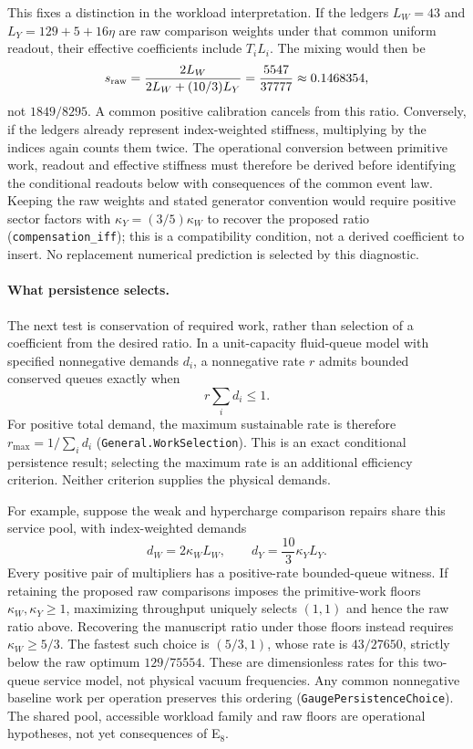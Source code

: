 This fixes a distinction in the workload interpretation. If the ledgers $L_W=43$ and $L_Y=129+5+16\eta$ are raw comparison weights under that common uniform readout, their effective coefficients include $T_iL_i$. The mixing would then be
\begin{equation}
 s_{\rm raw}=\frac{2L_W}{2L_W+(10/3)L_Y}
 =\frac{5547}{37777}\approx0.1468354,
\end{equation}
not $1849/8295$. A common positive calibration cancels from this ratio. Conversely, if the ledgers already represent index-weighted stiffness, multiplying by the indices again counts them twice. The operational conversion between primitive work, readout and effective stiffness must therefore be derived before identifying the conditional readouts below with consequences of the common event law. Keeping the raw weights and stated generator convention would require positive sector factors with $\kappa_Y=(3/5)\kappa_W$ to recover the proposed ratio (\texttt{compensation\_iff}); this is a compatibility condition, not a derived coefficient to insert. No replacement numerical prediction is selected by this diagnostic.

\paragraph{What persistence selects.} The next test is conservation of required work, rather than selection of a coefficient from the desired ratio. In a unit-capacity fluid-queue model with specified nonnegative demands $d_i$, a nonnegative rate $r$ admits bounded conserved queues exactly when
\begin{equation}
 r\sum_i d_i\le1.
\end{equation}
For positive total demand, the maximum sustainable rate is therefore $r_{\max}=1/\sum_i d_i$ (\texttt{General.WorkSelection}). This is an exact conditional persistence result; selecting the maximum rate is an additional efficiency criterion. Neither criterion supplies the physical demands.

For example, suppose the weak and hypercharge comparison repairs share this service pool, with index-weighted demands
\begin{equation}
 d_W=2\kappa_W L_W,\qquad d_Y=\frac{10}{3}\kappa_Y L_Y.
\end{equation}
Every positive pair of multipliers has a positive-rate bounded-queue witness. If retaining the proposed raw comparisons imposes the primitive-work floors $\kappa_W,\kappa_Y\ge1$, maximizing throughput uniquely selects $(1,1)$ and hence the raw ratio above. Recovering the manuscript ratio under those floors instead requires $\kappa_W\ge5/3$. The fastest such choice is $(5/3,1)$, whose rate is $43/27650$, strictly below the raw optimum $129/75554$. These are dimensionless rates for this two-queue service model, not physical vacuum frequencies. Any common nonnegative baseline work per operation preserves this ordering (\texttt{GaugePersistenceChoice}). The shared pool, accessible workload family and raw floors are operational hypotheses, not yet consequences of E$_8$.

